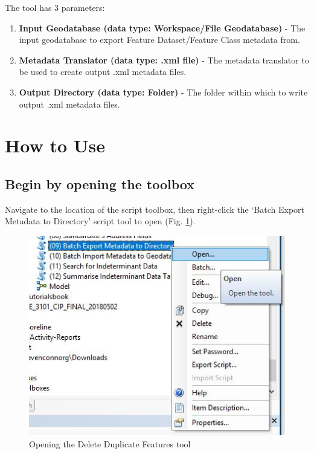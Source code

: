 \documentclass[openany]{book}
\theoremstyle{definition}
\theoremstyle{definition}
\theoremstyle{definition}
\theoremstyle{remark}
\begin{document}
The tool has 3 parameters:

\begin{enumerate}
\def\labelenumi{\arabic{enumi}.}
\item
  \textbf{Input Geodatabase (data type: Workspace/File Geodatabase)} -
  The input geodatabase to export Feature Dataset/Feature Class metadata
  from.
\item
  \textbf{Metadata Translator (data type: .xml file)} - The metadata
  translator to be used to create output .xml metadata files.
\item
  \textbf{Output Directory (data type: Folder)} - The folder within
  which to write output .xml metadata files.
\end{enumerate}

\section{How to Use}\label{how-to-use-9}

\subsection{Begin by opening the
toolbox}\label{begin-by-opening-the-toolbox-9}

Navigate to the location of the script toolbox, then right-click the
`Batch Export Metadata to Directory' script tool to open (Fig.
\ref{fig:exMetaopen}).

\begin{figure}[H]

{\centering \includegraphics{figures/exMeta-open} 

}

\caption{Opening the Delete Duplicate Features tool}\label{fig:exMetaopen}
\end{figure}
\end{document}
